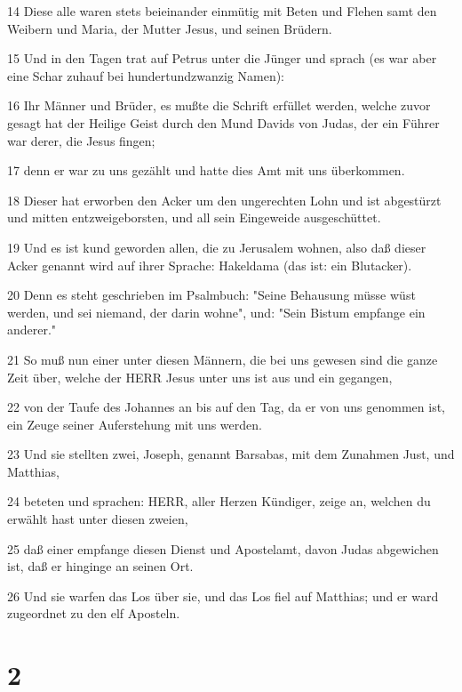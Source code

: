 \par 14 Diese alle waren stets beieinander einmütig mit Beten und Flehen samt den Weibern und Maria, der Mutter Jesus, und seinen Brüdern.
\par 15 Und in den Tagen trat auf Petrus unter die Jünger und sprach (es war aber eine Schar zuhauf bei hundertundzwanzig Namen):
\par 16 Ihr Männer und Brüder, es mußte die Schrift erfüllet werden, welche zuvor gesagt hat der Heilige Geist durch den Mund Davids von Judas, der ein Führer war derer, die Jesus fingen;
\par 17 denn er war zu uns gezählt und hatte dies Amt mit uns überkommen.
\par 18 Dieser hat erworben den Acker um den ungerechten Lohn und ist abgestürzt und mitten entzweigeborsten, und all sein Eingeweide ausgeschüttet.
\par 19 Und es ist kund geworden allen, die zu Jerusalem wohnen, also daß dieser Acker genannt wird auf ihrer Sprache: Hakeldama (das ist: ein Blutacker).
\par 20 Denn es steht geschrieben im Psalmbuch: "Seine Behausung müsse wüst werden, und sei niemand, der darin wohne", und: "Sein Bistum empfange ein anderer."
\par 21 So muß nun einer unter diesen Männern, die bei uns gewesen sind die ganze Zeit über, welche der HERR Jesus unter uns ist aus und ein gegangen,
\par 22 von der Taufe des Johannes an bis auf den Tag, da er von uns genommen ist, ein Zeuge seiner Auferstehung mit uns werden.
\par 23 Und sie stellten zwei, Joseph, genannt Barsabas, mit dem Zunahmen Just, und Matthias,
\par 24 beteten und sprachen: HERR, aller Herzen Kündiger, zeige an, welchen du erwählt hast unter diesen zweien,
\par 25 daß einer empfange diesen Dienst und Apostelamt, davon Judas abgewichen ist, daß er hinginge an seinen Ort.
\par 26 Und sie warfen das Los über sie, und das Los fiel auf Matthias; und er ward zugeordnet zu den elf Aposteln.

\chapter{2}

